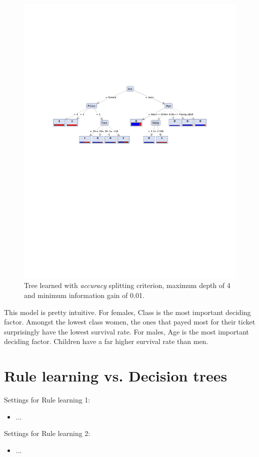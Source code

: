 \documentclass[12pt,a4paper]{article}
\begin{document}
\begin{figure}[htbp]
  \centering
  \includegraphics[width = .8\textwidth]{tree_final}
  \captionsetup{width=.8\textwidth}
  \caption{Tree learned with \emph{accuracy} splitting criterion, maximum depth of 4 and minimum information gain of 0.01.}
  \label{fig:tree_final}
\end{figure}
\par This model is pretty intuitive. For females, Class is the most important deciding factor. Amongst the lowest class women, the ones that payed most for their ticket surprisingly have the lowest survival rate. For males, Age is the most important deciding factor. Children have a far higher survival rate than men.

\section{Rule learning vs. Decision trees}

Settings for Rule learning 1:
\begin{itemize}
\item ...
\end{itemize}

Settings for Rule learning 2:
\begin{itemize}
\item ...
\end{itemize}
\end{document}
